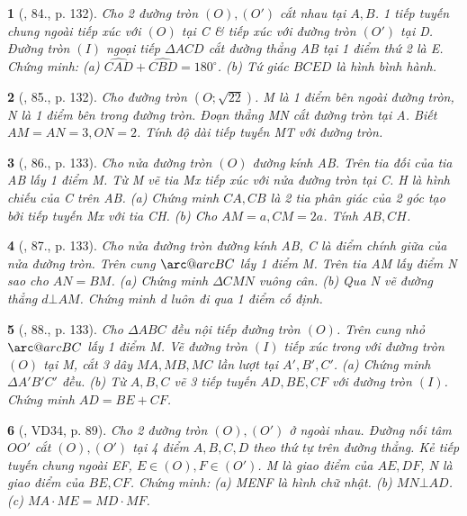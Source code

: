 \documentclass{article}
\makeatletter
\newcommand{\arc@char}{{\usefont{U}{tipa}{m}{n}\symbol{62}}}%
\newcommand{\arc}[1]{\mathpalette\arc@arc{#1}}
\newcommand{\arc@arc}[2]{%
	\sbox0{$\m@th#1#2$}%
	\vbox{
		\hbox{\resizebox{\wd0}{\height}{\arc@char}}
		\nointerlineskip
		\box0
	}%
}
\newtheorem{baitoan}{}
\makeatother
\begin{document}
\begin{baitoan}[\cite{Tuyen_Toan_9_old}, 84., p. 132]
	Cho 2 đường tròn $(O),(O')$ cắt nhau tại $A,B$. 1 tiếp tuyến chung ngoài tiếp xúc với $(O)$ tại C \& tiếp xúc với đường tròn $(O')$ tại D. Đường tròn $(I)$ ngoại tiếp $\Delta ACD$ cắt đường thẳng AB tại 1 điểm thứ 2 là E. Chứng minh: (a) $\widehat{CAD} + \widehat{CBD} = 180^\circ$. (b) Tứ giác $BCED$ là hình bình hành.
\end{baitoan}

\begin{baitoan}[\cite{Tuyen_Toan_9_old}, 85., p. 132]
	Cho đường tròn $(O;\sqrt{22})$. M là 1 điểm bên ngoài đường tròn, N là 1 điểm bên trong đường tròn. Đoạn thẳng MN cắt đường tròn tại A. Biết $AM = AN = 3,ON = 2$. Tính độ dài tiếp tuyến MT với đường tròn.
\end{baitoan}

\begin{baitoan}[\cite{Tuyen_Toan_9_old}, 86., p. 133]
	Cho nửa đường tròn $(O)$ đường kính AB. Trên tia đối của tia AB lấy 1 điểm M. Từ M vẽ tia Mx tiếp xúc với nửa đường tròn tại C. H là hình chiếu của C trên AB. (a) Chứng minh $CA,CB$ là 2 tia phân giác của 2 góc tạo bởi tiếp tuyến Mx với tia CH. (b) Cho $AM = a,CM = 2a$. Tính $AB,CH$.
\end{baitoan}

\begin{baitoan}[\cite{Tuyen_Toan_9_old}, 87., p. 133]
	Cho nửa đường tròn đường kính AB, C là điểm chính giữa của nửa đường tròn. Trên cung $\arc{BC}$ lấy 1 điểm M. Trên tia AM lấy điểm N sao cho $AN = BM$. (a) Chứng minh $\Delta CMN$ vuông cân. (b) Qua N vẽ đường thẳng $d\bot AM$. Chứng minh d luôn đi qua 1 điểm cố định.
\end{baitoan}

\begin{baitoan}[\cite{Tuyen_Toan_9_old}, 88., p. 133]
	Cho $\Delta ABC$ đều nội tiếp đường tròn $(O)$. Trên cung nhỏ $\arc{BC}$ lấy 1 điểm M. Vẽ đường tròn $(I)$ tiếp xúc trong với đường tròn $(O)$ tại M, cắt 3 dây $MA,MB,MC$ lần lượt tại $A',B',C'$. (a) Chứng minh $\Delta A'B'C'$ đều. (b) Từ $A,B,C$ vẽ 3 tiếp tuyến $AD,BE,CF$ với đường tròn $(I)$. Chứng minh $AD = BE + CF$.
\end{baitoan}

\begin{baitoan}[\cite{Binh_Toan_9_tap_2}, VD34, p. 89]
	Cho 2 đường tròn $(O),(O')$ ở ngoài nhau. Đường nối tâm $OO'$ cắt $(O),(O')$ tại 4 điểm $A,B,C,D$ theo thứ tự trên đường thẳng. Kẻ tiếp tuyến chung ngoài EF, $E\in(O),F\in(O')$. M là giao điểm của $AE,DF$, N là giao điểm của $BE,CF$. Chứng minh: (a) MENF là hình chữ nhật. (b) $MN\bot AD$. (c) $MA\cdot ME = MD\cdot MF$.
\end{baitoan}
\end{document}
